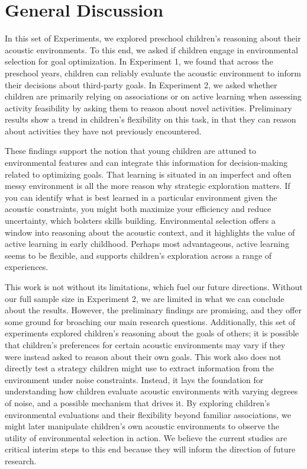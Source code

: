 \documentclass[10pt, letterpaper]{article}
\begin{document}
\hypertarget{general-discussion}{%
\section{General Discussion}\label{general-discussion}}

In this set of Experiments, we explored preschool children's reasoning
about their acoustic environments. To this end, we asked if children
engage in environmental selection for goal optimization. In Experiment
1, we found that across the preschool years, children can reliably
evaluate the acoustic environment to inform their decisions about
third-party goals. In Experiment 2, we asked whether children are
primarily relying on associations or on active learning when assessing
activity feasibility by asking them to reason about novel activities.
Preliminary results show a trend in children's flexibility on this task,
in that they can reason about activities they have not previously
encountered.

These findings support the notion that young children are attuned to
environmental features and can integrate this information for
decision-making related to optimizing goals. That learning is situated
in an imperfect and often messy environment is all the more reason why
strategic exploration matters. If you can identify what is best learned
in a particular environment given the acoustic constraints, you might
both maximize your efficiency and reduce uncertainty, which bolsters
skills building. Environmental selection offers a window into reasoning
about the acoustic context, and it highlights the value of active
learning in early childhood. Perhaps most advantageous, active learning
seems to be flexible, and supports children's exploration across a range
of experiences.

This work is not without its limitations, which fuel our future
directions. Without our full sample size in Experiment 2, we are limited
in what we can conclude about the results. However, the preliminary
findings are promising, and they offer some ground for broaching our
main research questions. Additionally, this set of experiments explored
children's reasoning about the goals of others; it is possible that
children's preferences for certain acoustic environments may vary if
they were instead asked to reason about their own goals. This work also
does not directly test a strategy children might use to extract
information from the environment under noise constraints. Instead, it
lays the foundation for understanding how children evaluate acoustic
environments with varying degrees of noise, and a possible mechanism
that drives it. By exploring children's environmental evaluations and
their flexibility beyond familiar associations, we might later
manipulate children's own acoustic environments to observe the utility
of environmental selection in action. We believe the current studies are
critical interim steps to this end because they will inform the
direction of future research.
\end{document}
